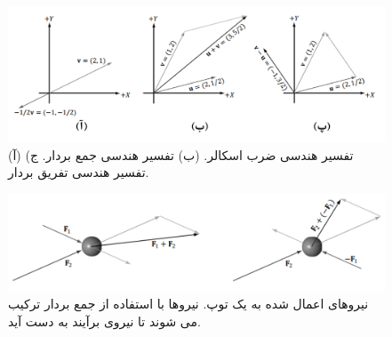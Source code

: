 {\begin{spacing}{1.5}
        \begin{figure}[H]
            \centering
            \setlength{\belowcaptionskip}{-10pt}
            \includegraphics[width=\textwidth]{Images/4/4.Session.1.1.6}
            \caption{(آ) تفسیر هندسی ضرب اسکالر. (ب) تفسیر هندسی جمع بردار. ج) تفسیر هندسی تفریق بردار.}
            \label{fig:4.Session.1.1.6}
        \end{figure}

        \begin{figure}[H]
            \centering
            \setlength{\belowcaptionskip}{-10pt}
            \includegraphics[width=\textwidth]{Images/4/4.Session.1.1.7}
            \caption{نیروهای اعمال شده به یک توپ. نیروها با استفاده از جمع بردار ترکیب می شوند تا نیروی برآیند به دست آید.}
            \label{fig:4.Session.1.1.7}
        \end{figure}
    \end{spacing}
}


